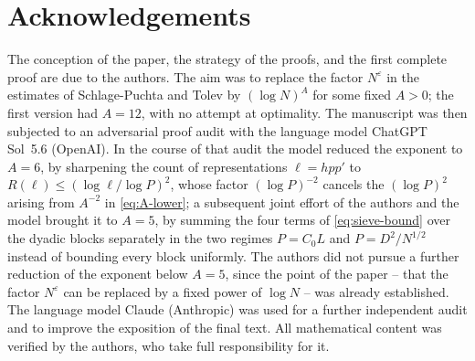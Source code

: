 \documentclass[11pt]{amsart}
\numberwithin{equation}{section}
\numberwithin{figure}{section}
\theoremstyle{definition}
\newcommand{\eps}{\varepsilon}
\begin{document}
\section*{Acknowledgements}

The conception of the paper, the strategy of the proofs, and
the first complete proof are due to the authors.  The aim was to replace
the factor $N^{\eps}$ in the estimates of Schlage-Puchta and Tolev by
$(\log N)^A$ for some fixed $A>0$; the first version had $A=12$, with no
attempt at optimality.  The manuscript was then subjected to an adversarial proof audit with
the language model ChatGPT Sol~5.6 (OpenAI).  In the course of that audit
the model reduced the exponent to $A=6$, by sharpening the count of
representations $\ell=hpp'$ to $R(\ell)\le(\log\ell/\log P)^2$, whose
factor $(\log P)^{-2}$ cancels the $(\log P)^2$ arising from $A^{-2}$ in
\eqref{eq:A-lower}; a subsequent joint effort of the authors and the model
brought it to $A=5$, by summing the four terms of \eqref{eq:sieve-bound}
over the dyadic blocks separately in the two regimes $P=C_0L$ and
$P=D^2/N^{1/2}$ instead of bounding every block uniformly. The authors
did not pursue a further reduction of the exponent below $A=5$, since the
point of the paper -- that the factor $N^{\eps}$ can be replaced by a fixed
power of $\log N$ -- was already established.  The language
model Claude (Anthropic) was used for a further independent audit and to
improve the exposition of the final text.  All mathematical content was
verified by the authors, who take full responsibility for it.
\end{document}
